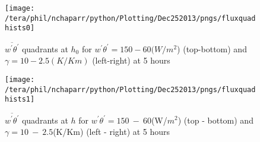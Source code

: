 \begin{figure}[htbp]
%
        
%
       
\centering
 \texttt{[image: /tera/phil/nchaparr/python/Plotting/Dec252013/pngs/fluxquadhists0]}                 

\label{fig:fluxquadsh0}
\caption{ $\overline{w^{'}\theta^{'}}$ quadrants at $h_{0}$ for $w^{'}\theta^{'} = 150 - 60 (W/m^{2}$) (top-bottom) and $\gamma = 10 - 2.5 (K/Km)$ (left-right) at 5 hours}
\end{figure}

\begin{figure}[htbp]
%
\centering
 \texttt{[image: /tera/phil/nchaparr/python/Plotting/Dec252013/pngs/fluxquadhists1]}                 

\caption{ $\overline{w^{'}\theta^{'}}$ quadrants at $h$ for $w^{'}\theta^{'} = 150 \ - \ 60$(W/$m^{2}$) (top - bottom) and $\gamma = 10 \ - \  2.5$(K/Km) (left - right) at 5 hours}

\label{fig:fluxquadsh}

\end{figure}

